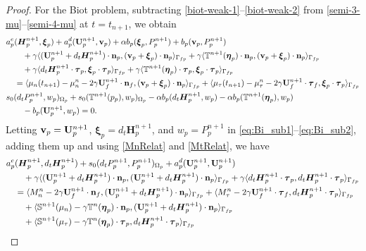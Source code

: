 \documentclass[11pt]{article}
\def\bv{{\bf v}}
\def\n{{\bf n}}
\def\btau{\boldsymbol{\tau}}
\def\bbeta{\boldsymbol{\eta}}
\def\bxi{\boldsymbol{\xi}}
\def\U{{\bf U}}
\def\E{\boldsymbol{H}}
\def\O{\Omega}
\def\<{\langle}
\def\>{\rangle}
\def\ddt{d_t}
\begin{document}
\begin{proof}
{For the Biot problem, subtracting \eqref{biot-weak-1}--\eqref{biot-weak-2} from \eqref{semi-3-mu}--\eqref{semi-4-mu} at $t = t_{n+1}$}, we obtain
%
\begin{align}
  &
  a_p^e(\E_p^{n+1}, \bxi_p)
  + a_p^d (\U_p^{n+1}, \bv_p)
  + \alpha b_p(\bxi_p, P_p^{n+1})
  + b_p(\bv_p, P_p^{n+1})
  \nonumber\\
  & \qquad
  + \gamma \<(\U_p^{n+1} + \ddt \E_p^{n+1})\cdot \n_p, (\bv_p + \bxi_p)\cdot \n_p\>_{\Gamma_{fp}}
  + \gamma \<\mathbb{T}^{n+1}(\bbeta_p)\cdot \n_p,(\bv_p + \bxi_p)\cdot \n_p\>_{\Gamma_{fp}}
  \nonumber\\
  &\qquad
  + \gamma \<\ddt \E_p^{n+1}\cdot \btau_p, \bxi_p\cdot \btau_p\>_{\Gamma_{fp}} + \gamma \< \mathbb{T}^{n+1}(\bbeta_p)\cdot \btau_p, \bxi_p \cdot \btau_p\>_{\Gamma_{fp}} \nonumber\\
&\quad =  \< \mu_n(t_{n+1})- \mu_n^n  - 2\gamma \U_f^{n+1}\cdot \n_f, (\bv_p + \bxi_p)\cdot \n_p\>_{\Gamma_{fp}} + \<\mu_\tau(t_{n+1}) - \mu_\tau^n - 2\gamma \U_f^{n+1}\cdot \btau_f, \bxi_p \cdot \btau_p\>_{\Gamma_{fp}} \label{eq:Bi_sub1} \\
&s_0(\ddt P_p^{n+1}, w_p)_{\O_p} + s_0(\mathbb{T}^{n+1}(p_p),w_p)_{\O_p} - \alpha b_p(\ddt\E_p^{n+1},w_p) - \alpha b_p(\mathbb{T}^{n+1}(\bbeta_p),w_p)  \nonumber\\
& \qquad - b_p(\U_p^{n+1},w_p) = 0. \label{eq:Bi_sub2}
\end{align}
%
Letting $\bv_p = \U_p^{n+1}$, $\bxi_p = \ddt \E_p^{n+1}$, and $w_p = P_p^{n+1}$ in \eqref{eq:Bi_sub1}--\eqref{eq:Bi_sub2}, adding them up and using \eqref{MnRelat} and \eqref{MtRelat}, we have
%
\begin{align}
  &
  a_p^e(\E_p^{n+1}, \ddt \E_p^{n+1})
  + s_0(\ddt P_p^{n+1}, P_p^{n+1})_{\O_p}
  + a_p^d (\U_p^{n+1}, \U_p^{n+1})
  \nonumber \\
&\qquad + \gamma \<(\U_p^{n+1} + \ddt \E_p^{n+1})\cdot \n_p, (\U_p^{n+1} + \ddt\E_p^{n+1})\cdot \n_p\>_{\Gamma_{fp}}+ \gamma \<\ddt \E_p^{n+1}\cdot \btau_p, \ddt \E_p^{n+1}\cdot \btau_p\>_{\Gamma_{fp}} \nonumber\\
&\quad =  \<M_n^n  - 2\gamma \U_f^{n+1}\cdot \n_f, (\U_p^{n+1} + \ddt\E_p^{n+1})\cdot \n_p\>_{\Gamma_{fp}} + \<M_\tau^n - 2\gamma \U_f^{n+1}\cdot \btau_f, \ddt \E_p^{n+1} \cdot \btau_p\>_{\Gamma_{fp}} \nonumber\\
  &\qquad + \< \mathbb{S}^{n+1}(\mu_n) - \gamma \mathbb{T}^n(\bbeta_p)\cdot \n_p,(\U_p^{n+1} + \ddt \E_p^{n+1})\cdot \n_p\>_{\Gamma_{fp}} \nonumber\\
&\qquad   
  + \< \mathbb{S}^{n+1}(\mu_\tau) - \gamma \mathbb{T}^n(\bbeta_p)\cdot \btau_p,\ddt \E_p^{n+1}\cdot \btau_p\>_{\Gamma_{fp}}\nonumber\\

\end{align}
\end{proof}
\end{document}
